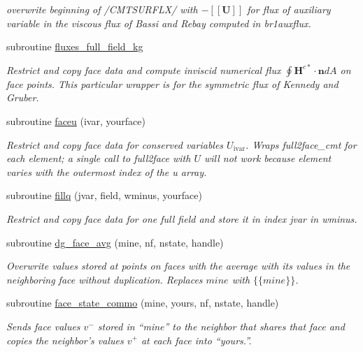 \begin{DoxyCompactItemize}
\begin{DoxyCompactList}\small\item\em overwrite beginning of /\-C\-M\-T\-S\-U\-R\-F\-L\-X/ with $-[[\mathbf{U}]]$ for flux of auxiliary variable in the viscous flux of Bassi and Rebay computed in br1auxflux. \end{DoxyCompactList}\item 
subroutine \hyperlink{group__isurf_ga0013a607a259d0c07734b1816f8c9f60}{fluxes\-\_\-full\-\_\-field\-\_\-kg}
\begin{DoxyCompactList}\small\item\em Restrict and copy face data and compute inviscid numerical flux $\oint \mathbf{H}^{c\ast}\cdot\mathbf{n}dA$ on face points. This particular wrapper is for the symmetric flux of Kennedy and Gruber. \end{DoxyCompactList}\item 
subroutine \hyperlink{group__isurf_ga272adf58402c1bfb170c8667bf6be790}{faceu} (ivar, yourface)
\begin{DoxyCompactList}\small\item\em Restrict and copy face data for conserved variables $U_{\mbox{ivar}}$. Wraps full2face\-\_\-cmt for each element; a single call to full2face with $U$ will not work because element varies with the outermost index of the u array. \end{DoxyCompactList}\item 
subroutine \hyperlink{group__isurf_gae375bb9d6acee4eff74aa072206109a2}{fillq} (jvar, field, wminus, yourface)
\begin{DoxyCompactList}\small\item\em Restrict and copy face data for one full field and store it in index jvar in wminus. \end{DoxyCompactList}\item 
subroutine \hyperlink{group__isurf_ga317b9a948c8717ad9c64e0fae72c8641}{dg\-\_\-face\-\_\-avg} (mine, nf, nstate, handle)
\begin{DoxyCompactList}\small\item\em Overwrite values stored at points on faces with the average with its values in the neighboring face without duplication. Replaces $mine$ with $\{\{mine\}\}$. \end{DoxyCompactList}\item 
subroutine \hyperlink{group__isurf_ga53412d5d95cd62ca86dd08374a330b02}{face\-\_\-state\-\_\-commo} (mine, yours, nf, nstate, handle)
\begin{DoxyCompactList}\small\item\em Sends face values $v^-$ stored in ``mine'' to the neighbor that shares that face and copies the neighbor's values $v^+$ at each face into ``yours.''. \end{DoxyCompactList}\item 

\end{DoxyCompactItemize}
